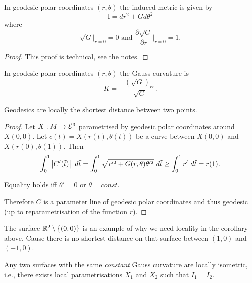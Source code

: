 \begin{lemma}
	In geodesic polar coordinates $(r,\theta)$ the induced metric is given by 
		\[ \mathrm I = dr^2 + Gd\theta^2  \]
	where 
		\[ \sqrt{G}\big |_{r=0} = 0 \text{ and }\frac {\partial \sqrt G}{\partial r} \big |_{r=0} = 1. \]
\end{lemma}

\begin{proof}
	This proof is technical, see the notes.
\end{proof}

\begin{example}
	In geodesic polar coordinates $(r,\theta)$ the Gauss curvature is 
		\[ K= - \frac {(\sqrt{G})_{rr}}{\sqrt G}. \]
\end{example}

\begin{corollary}
	Geodesics are locally the shortest distance between two points.
\end{corollary}

\begin{proof}
	Let $X: M \to \mathcal E^3$ parametrised by geodesic polar coordinates around $X(0,0)$. Let $c(t)= X(r(t),\theta(t))$ be a curve between $X(0,0)$ and $X(r(0),\theta(1))$. Then 
		\[ \int_0^1 \left| C'(\tilde t)\right| \ d\tilde t
			= \int_0^1 \sqrt{r'^2 + G(r,\theta)\theta'^2}\ d\tilde t
			\geq \int_0^1 r'\ d\tilde t
			= r(1). \]
			
	Equality holds iff $\theta'=0$ or $\theta = const$.
	
	Therefore $C$ is a parameter line of geodesic polar coordinates and thus geodesic (up to reparametrisation of the function $r$).
\end{proof}

\begin{remark}
	The surface $\mathbb R^2 \setminus \{(0,0)\}$ is an example of why we need locality in the corollary above. Cause there is no shortest distance on that surface between $(1,0)$ and $(-1,0)$.
\end{remark}

\begin{theorem}
	Any two surfaces with the same \emph{constant} Gauss curvature are locally isometric, i.e., there exists local parametrisations $X_1$ and $X_2$ such that $I_1=I_2$. 
\end{theorem}


